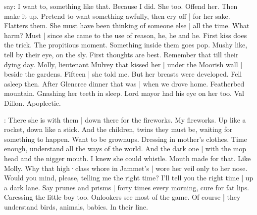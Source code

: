 say:
I want to,
something like that.
Because I did.
She too.
Offend her.
Then make it up.
Pretend to want something awfully,
then cry off |
for her sake.
Flatters them.
She must have been thinking of someone else |
all the time.
What harm?
Must |
since she came to the use of reason,
he,
he and he.
First kiss does the trick.
The propitious moment.
Something inside them goes pop.
Mushy like,
tell by their eye,
on the sly.
First thoughts are best.
Remember that
till their dying day.
Molly,
lieutenant Mulvey that kissed her |
under the Moorish wall |
beside the gardens.%
Fifteen |
she told me.
But her breasts were developed.
Fell asleep then.
After Glencree dinner that was |
when we drove home.
Featherbed mountain.
Gnashing her teeth in sleep.
Lord mayor had his eye on her too.
Val Dillon.
Apoplectic.

\Bloom:
There she is with them |
down there for the fireworks.
My fireworks.
Up like a rocket,
down like a stick.
And the children,
twins they must be,
waiting for something to happen.
Want to be grownups.
Dressing in mother's clothes.
Time enough,
understand all the ways of the world.
And the dark one |
with the mop head
and the nigger mouth.
I knew she could whistle.
Mouth made for that.
Like Molly.
Why that high·class whore in Jammet's |
wore her veil
only to her nose.%
Would you mind,
please,
telling me the right time?
I'll tell you the right time |
up a dark lane.
Say prunes and prisms |
forty times every morning,
cure for fat lips.
Caressing the little boy too.
Onlookers see most of the game.
Of course |
they understand birds,
animals,
babies.
In their line.

